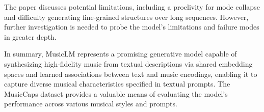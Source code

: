 The paper discusses potential limitations, including a proclivity for mode collapse and difficulty generating fine-grained structures over long sequences. However, further investigation is needed to probe the model's limitations and failure modes in greater depth.

In summary, MusicLM represents a promising generative model capable of synthesizing high-fidelity music from textual descriptions via shared embedding spaces and learned associations between text and music encodings, enabling it to capture diverse musical characteristics specified in textual prompts. The MusicCaps dataset provides a valuable means of evaluating the model's performance across various musical styles and prompts.